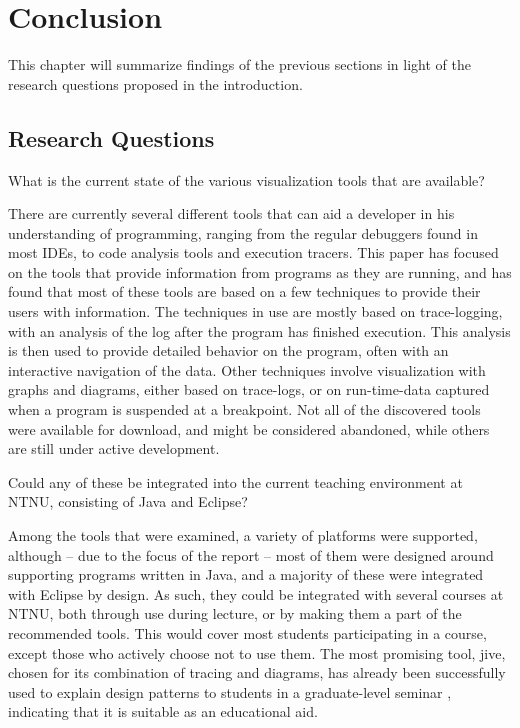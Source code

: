 \chapter{Conclusion}\label{conclusion}

This chapter will summarize findings of the previous sections in light of the research questions proposed in the introduction.

\section{Research Questions}\label{conclusionRQs}


\begin{theorem}
What is the current state of the various visualization tools that are available?
\end{theorem}
There are currently several different tools that can aid a developer in his understanding of programming, ranging from the regular debuggers found in most IDEs, to code analysis tools and execution tracers.
This paper has focused on the tools that provide information from programs as they are running, and has found that most of these tools are based on a few techniques to provide their users with information.
The techniques in use are mostly based on trace-logging, with an analysis of the log after the program has finished execution.
This analysis is then used to provide detailed behavior on the program, often with an interactive navigation of the data.
Other techniques involve visualization with graphs and diagrams, either based on trace-logs, or on run-time-data captured when a program is suspended at a breakpoint.
Not all of the discovered tools were available for download, and might be considered abandoned, while others are still under active development.


\begin{theorem}
Could any of these be integrated into the current teaching environment at NTNU, consisting of Java and Eclipse?
\end{theorem}
Among the tools that were examined, a variety of platforms were supported, although -- due to the focus of the report -- most of them were designed around supporting programs written in Java, and a majority of these were integrated with Eclipse by design.
As such, they could be integrated with several courses at NTNU, both through use during lecture, or by making them a part of the recommended tools.
This would cover most students participating in a course, except those who actively choose not to use them.
The most promising tool, \gls{jive}, chosen for its combination of tracing and diagrams, has already been successfully used to explain design patterns to students in a graduate-level seminar \cite[p. 99]{Gestwicki2005}, indicating that it is suitable as an educational aid.



